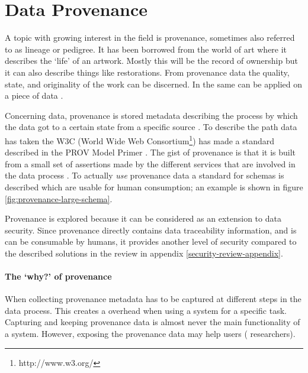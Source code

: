 \newcommand{\agent}{{\tt agent}}
\newcommand{\entity}{{\tt entity}}
\newcommand{\activity}{{\tt activity}}
\newcommand{\relation}{{\tt relation}}
\newcommand{\relations}{{\tt relations}}
\newcommand{\attributes}{{\tt attributes}}

\section{Data Provenance}
\label{datamodel-provenance}

A topic with growing interest in the \escience{} field is provenance, sometimes also referred to as lineage or pedigree.
It has been borrowed from the world of art where it describes the `life' of an artwork.
Mostly this will be the record of ownership but it can also describe things like restorations.
From provenance data the quality, state, and originality of the work can be discerned.
In \escience{} the same can be applied on a piece of data \cite{dsp4moreau}.

Concerning data, provenance is stored metadata describing the process by which the data got to a certain state from a specific source \cite{dsp4moreau,dsp2buneman}.
To describe the path data has taken the W3C (World Wide Web Consortium\footnote{http://www.w3.org/}) has made a standard described in the PROV Model Primer \cite{dsp8gil}.
The gist of provenance is that it is built from a small set of assertions made by the different services that are involved in  the data process \cite{dsp4moreau}.
To actually \emph{use} provenance data a standard for schemas is described which are usable for human consumption; an example is shown in figure \ref{fig:provenance-large-schema}.

Provenance is explored because it can be considered as an extension to data security.
Since provenance directly contains data traceability information, and is can be consumable by humans, it provides another level of security compared to the described solutions in the review in appendix \ref{security-review-appendix}.

\paragraph{The `why?' of provenance}
\label{provenance-why}

When collecting provenance  metadata has to be captured at different steps in the data process.
This creates a overhead when using a system for a specific task.
Capturing and keeping provenance data is almost never the main functionality of a system.
However, exposing the provenance data may help users (\ie{} researchers).

